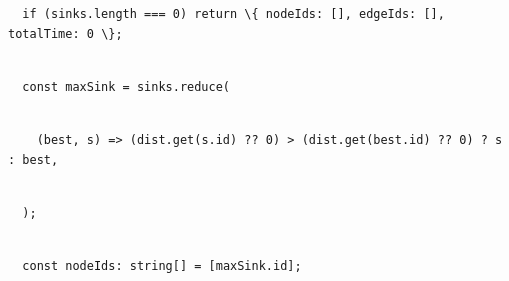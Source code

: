 \documentclass[
]{article}
\newcommand{\passthrough}[1]{#1}
\begin{document}
\passthrough{\lstinline!  !}\passthrough{\lstinline!if!}\passthrough{\lstinline! !}\passthrough{\lstinline!(!}\passthrough{\lstinline!sinks.length!}\passthrough{\lstinline! !}\passthrough{\lstinline!===!}\passthrough{\lstinline! !}\passthrough{\lstinline!0)!}\passthrough{\lstinline! !}\passthrough{\lstinline!return!}\passthrough{\lstinline! !}\passthrough{\lstinline!\{!}\passthrough{\lstinline! !}\passthrough{\lstinline!nodeIds!}\passthrough{\lstinline!:!}\passthrough{\lstinline! !}\passthrough{\lstinline![],!}\passthrough{\lstinline! !}\passthrough{\lstinline!edgeIds!}\passthrough{\lstinline!:!}\passthrough{\lstinline! !}\passthrough{\lstinline![],!}\passthrough{\lstinline! !}\passthrough{\lstinline!totalTime!}\passthrough{\lstinline!:!}\passthrough{\lstinline! !}\passthrough{\lstinline!0!}\passthrough{\lstinline! !}\passthrough{\lstinline!\};!}\strut \\
\passthrough{\lstinline!  !}\passthrough{\lstinline!const!}\passthrough{\lstinline! !}\passthrough{\lstinline!maxSink!}\passthrough{\lstinline! !}\passthrough{\lstinline!=!}\passthrough{\lstinline! !}\passthrough{\lstinline!sinks.reduce!}\passthrough{\lstinline!(!}\strut \\
\passthrough{\lstinline!    !}\passthrough{\lstinline!(best,!}\passthrough{\lstinline! !}\passthrough{\lstinline!s)!}\passthrough{\lstinline! !}\passthrough{\lstinline!=>!}\passthrough{\lstinline! !}\passthrough{\lstinline!(!}\passthrough{\lstinline!dist.get!}\passthrough{\lstinline!(s.id)!}\passthrough{\lstinline! !}\passthrough{\lstinline!??!}\passthrough{\lstinline! !}\passthrough{\lstinline!0)!}\passthrough{\lstinline! !}\passthrough{\lstinline!>!}\passthrough{\lstinline! !}\passthrough{\lstinline!(!}\passthrough{\lstinline!dist.get!}\passthrough{\lstinline!(best.id)!}\passthrough{\lstinline! !}\passthrough{\lstinline!??!}\passthrough{\lstinline! !}\passthrough{\lstinline!0)!}\passthrough{\lstinline! !}\passthrough{\lstinline!?!}\passthrough{\lstinline! !}\passthrough{\lstinline!s!}\passthrough{\lstinline! !}\passthrough{\lstinline!:!}\passthrough{\lstinline! !}\passthrough{\lstinline!best,!}\strut \\
\passthrough{\lstinline!  !}\passthrough{\lstinline!);!}\strut \\
\passthrough{\lstinline!  !}\passthrough{\lstinline!const!}\passthrough{\lstinline! !}\passthrough{\lstinline!nodeIds!}\passthrough{\lstinline!:!}\passthrough{\lstinline! !}\passthrough{\lstinline!string[]!}\passthrough{\lstinline! !}\passthrough{\lstinline!=!}\passthrough{\lstinline! !}\passthrough{\lstinline![maxSink.id];!}\strut \\
\end{document}

